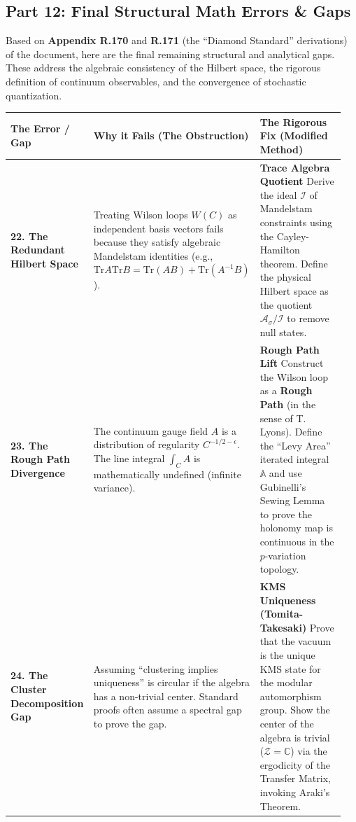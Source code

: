 \subsection{Part 12: Final Structural Math Errors \& Gaps}

Based on \textbf{Appendix R.170} and \textbf{R.171} (the ``Diamond Standard'' derivations) of the document, here are the final remaining structural and analytical gaps. These address the algebraic consistency of the Hilbert space, the rigorous definition of continuum observables, and the convergence of stochastic quantization.

\begin{center}
\begin{tabular}{|p{0.25\linewidth}|p{0.35\linewidth}|p{0.35\linewidth}|}
\hline
\textbf{The Error / Gap} & \textbf{Why it Fails (The Obstruction)} & \textbf{The Rigorous Fix (Modified Method)} \\
\hline
\textbf{22. The Redundant Hilbert Space} & Treating Wilson loops $W(C)$ as independent basis vectors fails because they satisfy algebraic Mandelstam identities (e.g., $\text{Tr}A \text{Tr}B = \text{Tr}(AB) + \text{Tr}(A^{-1}B)$). & \textbf{Trace Algebra Quotient} \newline Derive the ideal $\mathcal{I}$ of Mandelstam constraints using the Cayley-Hamilton theorem. Define the physical Hilbert space as the quotient $\mathcal{A}_{\sigma} / \mathcal{I}$ to remove null states. \\
\hline
\textbf{23. The Rough Path Divergence} & The continuum gauge field $A$ is a distribution of regularity $C^{-1/2-\epsilon}$. The line integral $\int_C A$ is mathematically undefined (infinite variance). & \textbf{Rough Path Lift} \newline Construct the Wilson loop as a \textbf{Rough Path} (in the sense of T. Lyons). Define the ``Levy Area'' iterated integral $\mathbb{A}$ and use Gubinelli's Sewing Lemma to prove the holonomy map is continuous in the $p$-variation topology. \\
\hline
\textbf{24. The Cluster Decomposition Gap} & Assuming ``clustering implies uniqueness'' is circular if the algebra has a non-trivial center. Standard proofs often assume a spectral gap to prove the gap. & \textbf{KMS Uniqueness (Tomita-Takesaki)} \newline Prove that the vacuum is the unique KMS state for the modular automorphism group. Show the center of the algebra is trivial ($\mathcal{Z} = \mathbb{C}$) via the ergodicity of the Transfer Matrix, invoking Araki's Theorem. \\

\end{tabular}
\end{center}
